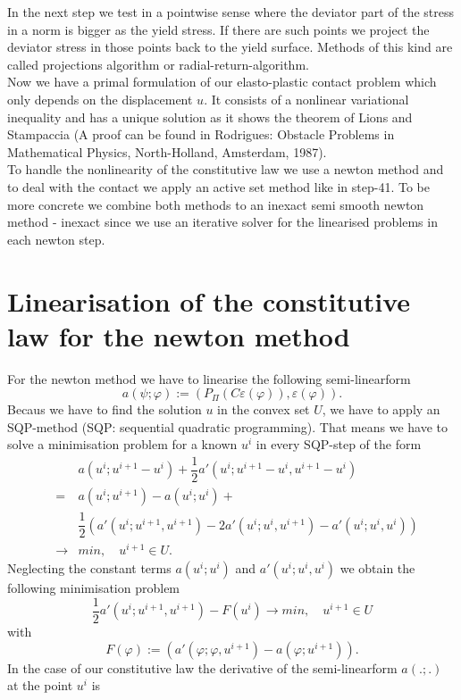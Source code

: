 \documentclass{article}
\begin{document}
In the next step we test in a pointwise sense where the deviator part of the stress in a norm is bigger as the yield stress.
If there are such points we project the deviator stress in those points back to the yield surface. Methods of this kind
are called projections algorithm or radial-return-algorithm.\\
Now we have a primal formulation of our elasto-plastic contact problem which only depends on the displacement $u$.
It consists of a nonlinear variational inequality and has a unique solution as it shows the theorem of Lions and Stampaccia 
(A proof can be found in Rodrigues: Obstacle Problems in Mathematical Physics, North-Holland, Amsterdam, 1987).\\
To handle the nonlinearity of the constitutive law we use a newton method and to deal with the contact we apply an
active set method like in step-41. To be more concrete we combine both methods to an inexact semi smooth newton
method - inexact since we use an iterative solver for the linearised problems in each newton step.

\section{Linearisation of the constitutive law for the newton method}

For the newton method we have to linearise the following semi-linearform
$$a(\psi;\varphi) := \left(P_{\Pi}(C\varepsilon(\varphi)),\varepsilon(\varphi)\right).$$
Becaus we have to find the solution $u$ in the convex set $U$, we have to apply an SQP-method (SQP: sequential quadratic
programming). That means we have to solve a minimisation problem for a known $u^i$ in every SQP-step of the form
\begin{eqnarray*}
 & & a(u^{i};u^{i+1} - u^i) + \dfrac{1}{2}a'(u^i;u^{i+1} - u^i,u^{i+1} - u^i)\\
 &=&  a(u^i;u^{i+1}) -  a(u^i;u^i) +\\
 & & \dfrac{1}{2}\left( a'(u^i;u^{i+1},u^{i+1}) - 2a'(u^i;u^i,u^{i+1}) - a'(u^i;u^i,u^i)\right)\\
 &\rightarrow& min,\quad u^{i+1}\in U.
\end{eqnarray*}
Neglecting the constant terms $ a(u^i;u^i)$ and $ a'(u^i;u^i,u^i)$ we obtain the following minimisation problem
$$\dfrac{1}{2} a'(u^i;u^{i+1},u^{i+1}) - F(u^i)\rightarrow min,\quad u^{i+1}\in U$$
with
$$F(\varphi) := \left(a'(\varphi;\varphi,u^{i+1}) -  a(\varphi;u^{i+1}) \right).$$
In the case of our constitutive law the derivative of the semi-linearform $a(.;.)$ at the point $u^i$ is
\end{document}

